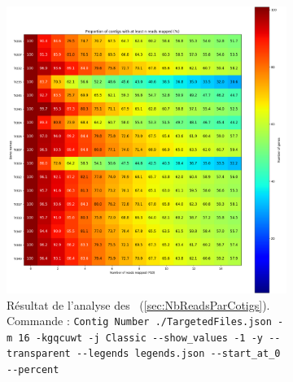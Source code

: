\documentclass[../main]{subfiles} %
\begin{document}
\addto\extrasfrench{\protected\edef:{\unexpanded\expandafter{:}}}

\begin{landscape}
\begin{figure}[p]
    \centering
    \begin{subfigure}[b]{0.55\paperwidth}
        \centering
        \includegraphics[width=\textwidth]{../Illustrations/Ex_Percent_Contig_Heatmap_global.png}
        \caption{Résultat de l'analyse des \BamTrEx (\ref{sec:NbReadsParCotigs}).\\
        Commande : \lstinline{Contig Number ./TargetedFiles.json -m 16 -kgqcuwt -j Classic --show_values -1 -y --transparent --legends legends.json --start_at_0 --percent}  
        }
        \label{fig:ContigsExPercent}
    \end{subfigure}
    \hfill
    \begin{subfigure}[b]{0.55\paperwidth}
        \centering

\end{subfigure}
\end{figure}
\end{landscape}
\end{document}
